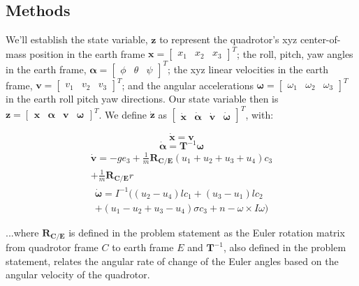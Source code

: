 \documentclass{article}
\begin{document}
\begin{multicols}{2}
\section*{Methods}
We'll establish the state variable, $\mathbf{z}$ to represent the quadrotor's xyz center-of-mass position in the earth 
frame $\mathbf{x}=\begin{bmatrix}x_1 & x_2 & x_3\end{bmatrix}^T$; the roll, pitch, yaw angles in the earth frame, $\bm{\alpha}=\begin{bmatrix}\phi & \theta & \psi\end{bmatrix}^T$; the xyz linear velocities in the earth frame, $\mathbf{v}=\begin{bmatrix}v_1 & v_2 & v_3\end{bmatrix}^T$; and the angular accelerations $\bm{\omega}=\begin{bmatrix}\omega_1 & \omega_2 & \omega_3\end{bmatrix}^T$ in the earth roll pitch yaw directions. Our state variable then is $\mathbf{z}=\begin{bmatrix}\mathbf{x}&\bm{\alpha}&\mathbf{v}&\bm{\omega}\end{bmatrix}^T$. We define $\boldsymbol{\dot{z}}$ as $\begin{bmatrix} \mathbf{\dot{x}}&\bm{\dot{\alpha}}&\mathbf{\dot{v}}&\bm{\dot{\omega}} \end{bmatrix}^T$, with:

\begin{equation}
    \mathbf{\dot{x}} =\mathbf{v}
\end{equation}
\begin{equation}
    \bm{\dot{\alpha}} =\mathbf{T}^{-1}\bm{\omega}
\end{equation}
\begin{align}
    \mathbf{\dot{v}} =-ge_3+\frac{1}{m}\mathbf{R_{C/E}}(u_1+u_2+u_3+u_4)c_3 \nonumber\\ +\frac{1}{m}\mathbf{R_{C/E}}r
\end{align}
\begin{align}
    \bm{\dot{\omega}} =I^{-1}((u_2-u_4)lc_1+(u_3-u_1)lc_2 \nonumber\\ +(u_1-u_2+u_3-u_4)\sigma c_3+n-\omega \times I \omega)
\end{align}

\noindent ...where $\mathbf{R_{C/E}}$ is defined in the problem statement as the Euler rotation matrix from quadrotor frame $C$ to earth frame $E$ and $\mathbf{T}^{-1}$, also defined in the problem statement, relates the angular rate of change of the Euler angles based on the angular velocity of the quadrotor.


\end{multicols}
\end{document}
